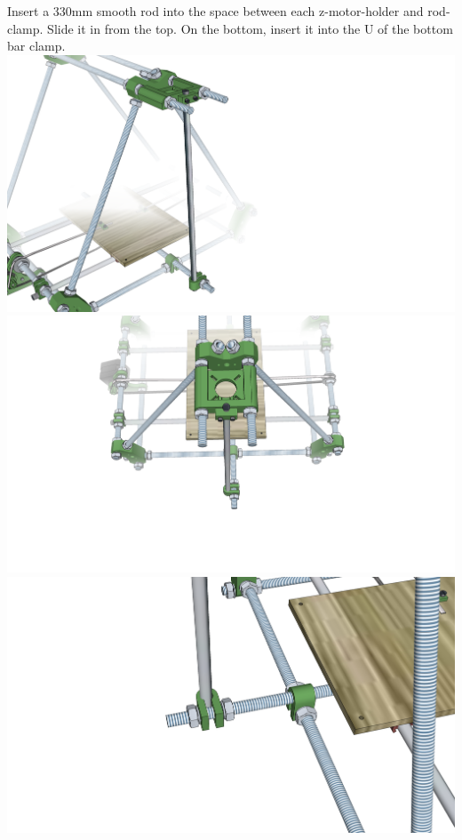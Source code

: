 \documentclass[twoside,openany,a4paper,titlepage]{memoir}
\begin{document}
	\section{}
	Insert a 330mm smooth rod into the space between each z-motor-holder and rod-clamp. Slide it in from
	the top. On the bottom, insert it into the U of the bottom bar clamp.\\
	\includegraphics[width=1\linewidth]{graphics/ch8_6_1.png}
	\includegraphics[width=1\linewidth]{graphics/ch8_6_2.png}
	\includegraphics[width=1\linewidth]{graphics/ch8_6_3.png}
	
\end{document}
